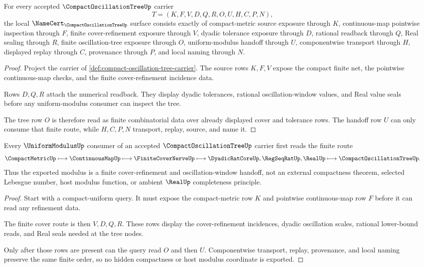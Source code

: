 \begin{theorem}
\label{thm:compact-oscillation-tree-namecert-obligations}
For every accepted $\CompactOscillationTreeUp$ carrier
$$
T=(K,F,V,D,Q,R,O,U,H,C,P,N),
$$
the local $\NameCert_{\CompactOscillationTreeUp}$ surface consists exactly of compact-metric source exposure through $K$, continuous-map pointwise inspection through $F$, finite cover-refinement exposure through $V$, dyadic tolerance exposure through $D$, rational readback through $Q$, Real sealing through $R$, finite oscillation-tree exposure through $O$, uniform-modulus handoff through $U$, componentwise transport through $H$, displayed replay through $C$, provenance through $P$, and local naming through $N$.
\end{theorem}
\begin{proof}
Project the carrier of \autoref{def:compact-oscillation-tree-carrier}. The source rows $K,F,V$ expose the compact finite net, the pointwise continuous-map checks, and the finite cover-refinement incidence data.

Rows $D,Q,R$ attach the numerical readback. They display dyadic tolerances, rational oscillation-window values, and Real value seals before any uniform-modulus consumer can inspect the tree.

The tree row $O$ is therefore read as finite combinatorial data over already displayed cover and tolerance rows. The handoff row $U$ can only consume that finite route, while $H,C,P,N$ transport, replay, source, and name it.
\end{proof}

\begin{theorem}
\label{thm:compact-oscillation-tree-uniform-modulus-handoff}
Every $\UniformModulusUp$ consumer of an accepted $\CompactOscillationTreeUp$ carrier first reads the finite route
$$
\CompactMetricUp \longmapsto \ContinuousMapUp \longmapsto \FiniteCoverNerveUp \longmapsto \DyadicRatCoreUp,\RegSeqRatUp,\RealUp \longmapsto \CompactOscillationTreeUp .
$$
Thus the exported modulus is a finite cover-refinement and oscillation-window handoff, not an external compactness theorem, selected Lebesgue number, host modulus function, or ambient $\RealUp$ completeness principle.
\end{theorem}
\begin{proof}
Start with a compact-uniform query. It must expose the compact-metric row $K$ and pointwise continuous-map row $F$ before it can read any refinement data.

The finite cover route is then $V,D,Q,R$. These rows display the cover-refinement incidences, dyadic oscillation scales, rational lower-bound reads, and Real seals needed at the tree nodes.

Only after those rows are present can the query read $O$ and then $U$. Componentwise transport, replay, provenance, and local naming preserve the same finite order, so no hidden compactness or host modulus coordinate is exported.
\end{proof}

